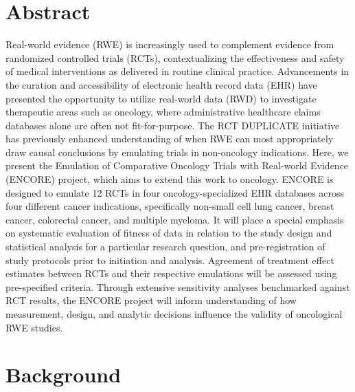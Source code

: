 \documentclass[
  letterpaper,
  DIV=11,
  numbers=noendperiod]{scrartcl}
\begin{document}
\newpage{}

\section*{Abstract}\label{abstract}

Real-world evidence (RWE) is increasingly used to complement evidence
from randomized controlled trials (RCTs), contextualizing the
effectiveness and safety of medical interventions as delivered in
routine clinical practice. Advancements in the curation and
accessibility of electronic health record data (EHR) have presented the
opportunity to utilize real-world data (RWD) to investigate therapeutic
areas such as oncology, where administrative healthcare claims databases
alone are often not fit-for-purpose. The RCT DUPLICATE initiative has
previously enhanced understanding of when RWE can most appropriately
draw causal conclusions by emulating trials in non-oncology indications.
Here, we present the Emulation of Comparative Oncology Trials with
Real-world Evidence (ENCORE) project, which aims to extend this work to
oncology. ENCORE is designed to emulate 12 RCTs in four
oncology-specialized EHR databases across four different cancer
indications, specifically non-small cell lung cancer, breast cancer,
colorectal cancer, and multiple myeloma. It will place a special
emphasis on systematic evaluation of fitness of data in relation to the
study design and statistical analysis for a particular research
question, and pre-registration of study protocols prior to initiation
and analysis. Agreement of treatment effect estimates between RCTs and
their respective emulations will be assessed using pre-specified
criteria. Through extensive sensitivity analyses benchmarked against RCT
results, the ENCORE project will inform understanding of how
measurement, design, and analytic decisions influence the validity of
oncological RWE studies.

\newpage{}

\section{Background}\label{background}
\end{document}

